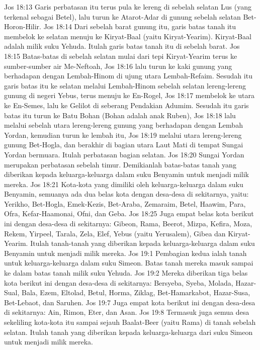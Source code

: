 Jos 18:13  Garis perbatasan itu terus pula ke lereng di sebelah selatan Lus (yang terkenal sebagai Betel), lalu turun ke Atarot-Adar di gunung sebelah selatan Bet-Horon-Hilir.
Jos 18:14  Dari sebelah barat gunung itu, garis batas tanah itu membelok ke selatan menuju ke Kiryat-Baal (yaitu Kiryat-Yearim). Kiryat-Baal adalah milik suku Yehuda. Itulah garis batas tanah itu di sebelah barat.
Jos 18:15  Batas-batas di sebelah selatan mulai dari tepi Kiryat-Yearim terus ke sumber-sumber air Me-Neftoah,
Jos 18:16  lalu turun ke kaki gunung yang berhadapan dengan Lembah-Hinom di ujung utara Lembah-Refaim. Sesudah itu garis batas itu ke selatan melalui Lembah-Hinom sebelah selatan lereng-lereng gunung di negeri Yebus, terus menuju ke En-Rogel,
Jos 18:17  membelok ke utara ke En-Semes, lalu ke Gelilot di seberang Pendakian Adumim. Sesudah itu garis batas itu turun ke Batu Bohan (Bohan adalah anak Ruben),
Jos 18:18  lalu melalui sebelah utara lereng-lereng gunung yang berhadapan dengan Lembah Yordan, kemudian turun ke lembah itu,
Jos 18:19  melalui utara lereng-lereng gunung Bet-Hogla, dan berakhir di bagian utara Laut Mati di tempat Sungai Yordan bermuara. Itulah perbatasan bagian selatan.
Jos 18:20  Sungai Yordan merupakan perbatasan sebelah timur. Demikianlah batas-batas tanah yang diberikan kepada keluarga-keluarga dalam suku Benyamin untuk menjadi milik mereka.
Jos 18:21  Kota-kota yang dimiliki oleh keluarga-keluarga dalam suku Benyamin, semuanya ada dua belas kota dengan desa-desa di sekitarnya, yaitu: Yerikho, Bet-Hogla, Emek-Kezis, Bet-Araba, Zemaraim, Betel, Haawim, Para, Ofra, Kefar-Haamonai, Ofni, dan Geba.
Jos 18:25  Juga empat belas kota berikut ini dengan desa-desa di sekitarnya: Gibeon, Rama, Beerot, Mizpa, Kefira, Moza, Rekem, Yirpeel, Tarala, Zela, Elef, Yebus (yaitu Yerusalem), Gibea dan Kiryat-Yearim. Itulah tanah-tanah yang diberikan kepada keluarga-keluarga dalam suku Benyamin untuk menjadi milik mereka.
Jos 19:1  Pembagian kedua ialah tanah untuk keluarga-keluarga dalam suku Simeon. Batas tanah mereka masuk sampai ke dalam batas tanah milik suku Yehuda.
Jos 19:2  Mereka diberikan tiga belas kota berikut ini dengan desa-desa di sekitarnya: Bersyeba, Syeba, Molada, Hazar-Sual, Bala, Ezem, Eltolad, Betul, Horma, Ziklag, Bet-Hamarkabot, Hazar-Susa, Bet-Lebaot, dan Saruhen.
Jos 19:7  Juga empat kota berikut ini dengan desa-desa di sekitarnya: Ain, Rimon, Eter, dan Asan.
Jos 19:8  Termasuk juga semua desa sekeliling kota-kota itu sampai sejauh Baalat-Beer (yaitu Rama) di tanah sebelah selatan. Itulah tanah yang diberikan kepada keluarga-keluarga dari suku Simeon untuk menjadi milik mereka.
